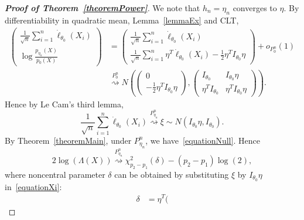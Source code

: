 \documentclass[3p]{elsarticle}
\theoremstyle{plain}
\theoremstyle{definition}
\theoremstyle{remark}
\begin{document}
\begin{proof}[\textbf{Proof of Theorem~\ref{theoremPower}}]
    We note that $h_n=\eta_n$ converges to $\eta$. By differentiability in quadratic mean, Lemma~\ref{lemmaEx} and CLT,
\begin{equation}
    \begin{aligned}
    \left(
    \begin{matrix}
        \frac{1}{\sqrt{n}}\sum^n_{i=1}\dot{\ell}_{\theta_0}(X_i)
        \\
        \log \frac{p_{\eta_n}(X)}{p_0(X)}
    \end{matrix}
    \right)
    &=\left(
        \begin{matrix}
        \frac{1}{\sqrt{n}}\sum^n_{i=1}\dot{\ell}_{\theta_0}(X_i)
        \\
        \frac{1}{\sqrt{n}}\sum^n_{i=1}\eta^T\dot{\ell}_{\theta_0}(X_i)-\frac{1}{2}\eta^T I_{\theta_0}\eta
        \end{matrix}
    \right)
    +o_{P_0^n}(1)\\
    &\overset{P_0^n}{\rightsquigarrow}
    N(
    \left(
    \begin{matrix}
        0\\
        -\frac{1}{2}\eta^T I_{\theta_0}\eta
    \end{matrix}
    \right),
    \left(
        \begin{matrix}
            I_{\theta_0}&I_{\theta_0}\eta\\
            \eta^T I_{\theta_0}&\eta^T I_{\theta_0}\eta
        \end{matrix}
    \right)
    ).
    \end{aligned}
\end{equation}
Hence by Le Cam's third lemma,
\begin{equation}
    \frac{1}{\sqrt{n}}\sum^n_{i=1}\dot{\ell}_{\theta_0}(X_i)\overset{P^n_{\eta_n}}{\rightsquigarrow}\xi\sim N(I_{\theta_0}\eta,I_{\theta_0}).
\end{equation}
By Theorem~\ref{theoremMain}, under $P_{\eta_n}^n$, we have~\eqref{equationNull}.
Hence
\begin{equation}
    2\log(\Lambda(X))\overset{P_{\eta_n}^n}{\rightsquigarrow} \chi^2_{p_2-p_1}(\delta)-(p_2-p_1)\log(2),
\end{equation}
where noncentral parameter $\delta$ can be obtained by substituting $\xi$ by $I_{\theta_0}\eta$ in~\eqref{equationXi}:
\begin{equation}
    \begin{aligned}
        \delta&=\eta^T(

\end{aligned}
\end{equation}
\end{proof}
\end{document}
